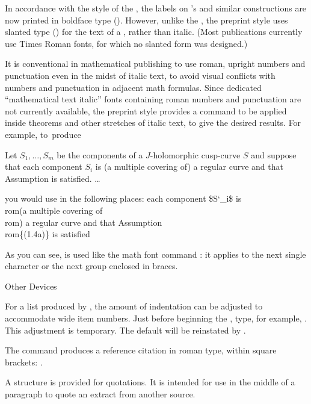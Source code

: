 In accordance with the style of the \JAMS, the labels on 's
and similar constructions are now printed in boldface type ().
However, unlike the \JAMS, the preprint style uses slanted type ()
for the text of a , rather than italic.
(Most \AMS{} publications currently use Times Roman fonts, for which no
slanted form was designed.)

It is conventional in mathematical publishing to use roman,  upright
numbers and punctuation even in the midst of
italic text, to avoid visual conflicts with numbers and punctuation in
adjacent math formulas.  Since dedicated ``mathematical text italic''
fonts containing roman numbers and punctuation are not currently
available, the  preprint style provides a command
 to be applied  inside theorems and other stretches of
italic text, to give the desired results.
For example, to~produce\-

 Let $S_1,\dots,S_m$ be the components
of a $J$-holomorphic cusp-curve $S$ and suppose that each
component $S_i$ is \rom(a multiple covering of\rom) a regular
curve and that Assumption  is satisfied. \dots
\endproclaim

\noindent you would use  in the following places:
\beginexample{}
each component \$S\char`\_i\$ is \\rom(a multiple covering of\\rom) a
regular curve and that Assumption \\rom\{(1.4a)\} is satisfied
\endexample 

As you can see,  is used like the math font command :
it applies to the next single character or the next group enclosed in
braces.

\subhead Other Devices \endsubhead

For a list produced by , the amount of indentation can be
adjusted to accommodate wide item numbers.  Just before beginning the
, type, for example, .
This adjustment is temporary.  The default will be reinstated by
.

The command  produces
a reference citation in roman type, within square brackets: \cite{21}.

A structure  is provided for quotations.
It is intended for use in the middle of a paragraph to quote an
extract from another source.


